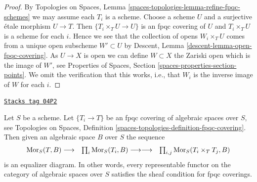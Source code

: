 \begin{proof}
By
Topologies on Spaces, Lemma \ref{spaces-topologies-lemma-refine-fpqc-schemes}
we may assume each $T_i$ is a scheme.
Choose a scheme $U$ and a surjective \'etale morphism $U \to T$.
Then $\{T_i \times_T U \to U\}$ is an fpqc covering of $U$
and $T_i \times_T U$ is a scheme for each $i$. Hence we
see that the collection of opens $W_i \times_T U$ comes from a unique
open subscheme $W' \subset U$ by
Descent, Lemma \ref{descent-lemma-open-fpqc-covering}.
As $U \to X$ is open we can define $W \subset X$ the Zariski
open which is the image of $W'$, see
Properties of Spaces, Section \ref{spaces-properties-section-points}.
We omit the verification that this works, i.e., that
$W_i$ is the inverse image of $W$ for each $i$.
\end{proof}

\begin{lemma}
\label{spaces-descent-lemma-fpqc-universal-effective-epimorphisms}
\href{https://stacks.math.columbia.edu/tag/04P2}{\texttt{Stacks tag 04P2}}

Let $S$ be a scheme. Let $\{T_i \to T\}$ be an fpqc covering of algebraic
spaces over $S$, see Topologies on Spaces, Definition
\ref{spaces-topologies-definition-fpqc-covering}.
Then given an algebraic space $B$ over $S$ the sequence
$$
\begin{array}{ccc}\operatorname{Mor}_S(T, B) \longrightarrow & \prod\nolimits_i \operatorname{Mor}_S(T_i, B) \longrightarrow\longrightarrow & \prod\nolimits_{i, j} \operatorname{Mor}_S(T_i \times_T T_j, B)\end{array}
$$
is an equalizer diagram.
In other words, every representable functor on the category of
algebraic spaces over $S$ satisfies the sheaf condition for
fpqc coverings.
\end{lemma}

